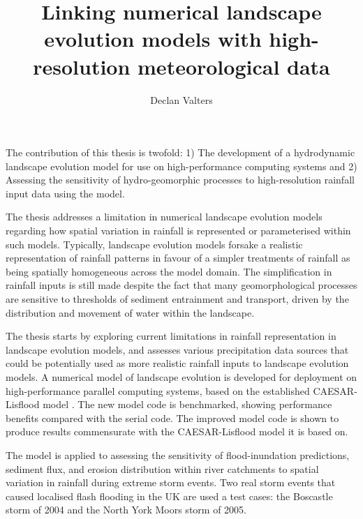 \title{Linking numerical landscape evolution models with high-resolution meteorological data}

\author{Declan Valters}
\def\wordcount{74031}




\beforeabstract
The contribution of this thesis is twofold: 1) The development of a hydrodynamic landscape evolution model for use on high-performance computing systems and 2) Assessing the sensitivity of hydro-geomorphic processes to high-resolution rainfall input data using the model.

The thesis addresses a limitation in numerical landscape evolution models regarding how spatial variation in rainfall is represented or parameterised within such models. Typically, landscape evolution models forsake a realistic representation of rainfall patterns in favour of a simpler treatments of rainfall as being spatially homogeneous across the model domain. The simplification in rainfall inputs is still made despite the fact that many geomorphological processes are sensitive to thresholds of sediment entrainment and transport, driven by the distribution and movement of water within the landscape. 

The thesis starts by exploring current limitations in rainfall representation in landscape evolution models, and assesses various precipitation data sources that could be potentially used as more realistic rainfall inputs to landscape evolution models. A numerical model of landscape evolution is developed for deployment on high-performance parallel computing systems, based on the established CAESAR-Lisflood model \citep{Coulthard2013}. The new model code is benchmarked, showing performance benefits compared with the serial code. The improved model code is shown to produce results commensurate with the CAESAR-Lisflood model it is based on.

The model is applied to assessing the sensitivity of flood-inundation predictions, sediment flux, and erosion distribution within river catchments to spatial variation in rainfall during extreme storm events. Two real storm events that caused localised flash flooding in the UK are used a test cases: the Boscastle storm of 2004 and the North York Moors storm of 2005. 

